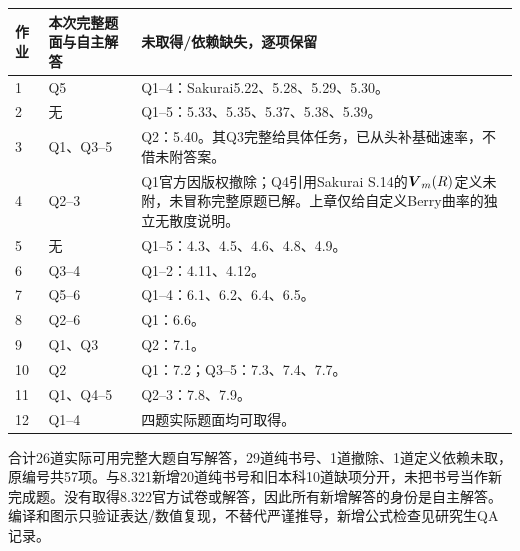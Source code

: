 \begin{longtable}{p{}p{}p{}}
\toprule 作业 & 本次完整题面与自主解答 & 未取得/依赖缺失，逐项保留\\\midrule\endhead
1 & Q5 & Q1--4：Sakurai5.22、5.28、5.29、5.30。\\
2 & 无 & Q1--5：5.33、5.35、5.37、5.38、5.39。\\
3 & Q1、Q3--5 & Q2：5.40。其Q3完整给具体任务，已从头补基础速率，不借未附答案。\\
4 & Q2--3 & Q1官方因版权撤除；Q4引用Sakurai S.14的$\boldsymbol{V}_m(R)$定义未附，未冒称完整原题已解。上章仅给自定义Berry曲率的独立无散度说明。\\
5 & 无 & Q1--5：4.3、4.5、4.6、4.8、4.9。\\
6 & Q3--4 & Q1--2：4.11、4.12。\\
7 & Q5--6 & Q1--4：6.1、6.2、6.4、6.5。\\
8 & Q2--6 & Q1：6.6。\\
9 & Q1、Q3 & Q2：7.1。\\
10 & Q2 & Q1：7.2；Q3--5：7.3、7.4、7.7。\\
11 & Q1、Q4--5 & Q2--3：7.8、7.9。\\
12 & Q1--4 & 四题实际题面均可取得。\\\bottomrule\end{longtable}
合计26道实际可用完整大题自写解答，29道纯书号、1道撤除、1道定义依赖未取，原编号共57项。与8.321新增20道纯书号和旧本科10道缺项分开，未把书号当作新完成题。没有取得8.322官方试卷或解答，因此所有新增解答的身份是自主解答。编译和图示只验证表达/数值复现，不替代严谨推导，新增公式检查见研究生QA记录。

